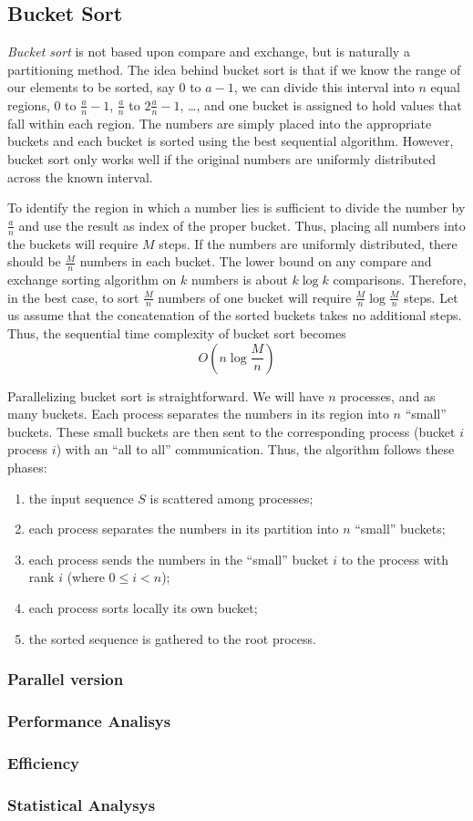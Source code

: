 \subsection{Bucket Sort}
\textit{Bucket sort} is not based upon compare and exchange, but is naturally a partitioning method. The idea behind bucket sort is that if we know the range of our elements to be sorted, say $0$ to $a-1$, we can divide this interval into $n$ equal regions, $0$ to $\frac{a}{n}-1$, $\frac{a}{n}$ to $2\frac{a}{n}-1$, \dots , and one bucket is assigned to hold values that fall within each region. The numbers are simply placed into the appropriate buckets and each bucket is sorted using the best sequential algorithm. However, bucket sort only works well if the original numbers are uniformly distributed across the known interval. 

To identify the region in which a number lies is sufficient to divide the number by $\frac{a}{n}$ and use the result as index of the proper bucket. Thus, placing all numbers into the buckets will require $M$ steps. If the numbers are uniformly distributed, there should be $\frac{M}{n}$ numbers in each bucket. The lower bound on any compare and exchange sorting algorithm on $k$ numbers is about $k \log k$ comparisons. Therefore, in the best case, to sort $\frac{M}{n}$ numbers of one bucket will require $\frac{M}{n} \log \frac{M}{n}$ steps. Let us assume that the concatenation of the sorted buckets takes no additional steps. Thus, the sequential time complexity of bucket sort becomes
\[
O( n \log \frac{M}{n} )
\]

Parallelizing bucket sort is straightforward. We will have $n$ processes, and as many buckets. Each process separates the numbers in its region into $n$ ``small'' buckets. These small buckets are then sent to the corresponding process (bucket $i$ process $i$) with an ``all to all'' communication. Thus, the algorithm follows these phases:
\begin{enumerate}	
	\item the input sequence $S$ is scattered among processes;
	\item each process separates the numbers in its partition into $n$ ``small'' buckets;
	\item each process sends the numbers in the ``small'' bucket $i$ to the process with rank $i$ (where $0 \leq i < n$);
	\item each process sorts locally its own bucket;
	\item the sorted sequence is gathered to the root process.
\end{enumerate}

 
\subsubsection*{Parallel version}
\subsubsection*{Performance Analisys} 
\subsubsection*{Efficiency} 
\subsubsection*{Statistical Analysys}